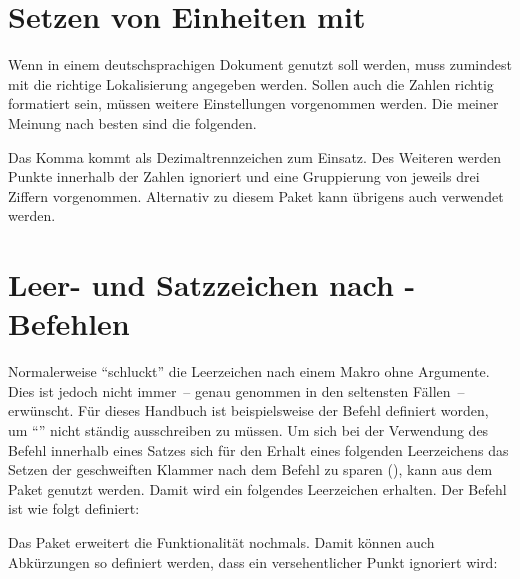 \section{Setzen von Einheiten mit }
\label{sec:tips:siunitx}
Wenn  in einem deutschsprachigen Dokument genutzt soll
werden, muss zumindest mit  die 
richtige Lokalisierung angegeben werden. Sollen auch die Zahlen richtig 
formatiert sein, müssen weitere Einstellungen vorgenommen werden. Die meiner 
Meinung nach besten sind die folgenden.
%
\begin{quoting}
\begin{Code}
\end{Code}
\end{quoting}
%
Das Komma kommt als Dezimaltrennzeichen zum Einsatz. Des Weiteren werden Punkte 
innerhalb der Zahlen ignoriert und eine Gruppierung von jeweils drei Ziffern 
vorgenommen. Alternativ zu diesem Paket kann übrigens auch  
verwendet werden.



\section{Leer- und Satzzeichen nach -Befehlen}%
\label{sec:tips:xspace}
Normalerweise \enquote{schluckt}  die Leerzeichen nach einem 
Makro ohne Argumente. Dies ist jedoch nicht immer~-- genau genommen in den 
seltensten Fällen~-- erwünscht. Für dieses Handbuch ist beispielsweise der 
Befehl  definiert worden, um \enquote{\TUD{}} nicht ständig 
ausschreiben zu müssen. Um sich bei der Verwendung des Befehl innerhalb eines 
Satzes sich für den Erhalt eines folgenden Leerzeichens das Setzen der 
geschweiften Klammer nach dem Befehl zu sparen (\PParameter{}), 
kann  aus dem Paket  genutzt werden. Damit wird 
ein folgendes Leerzeichen erhalten. Der Befehl  ist wie folgt 
definiert:
%
\begin{quoting}
\begin{Code}
\newcommand*\TUD{Technische Universit\"at Dresden\xspace}
\end{Code}
\end{quoting}
%
Das Paket  erweitert die Funktionalität nochmals. Damit 
können auch Abkürzungen so definiert werden, dass ein versehentlicher Punkt 
ignoriert wird:
%
\begin{quoting}
\begin{Code}
\newcommand*\zB{z.\,B\xperiod}
\end{Code}
\end{quoting}



